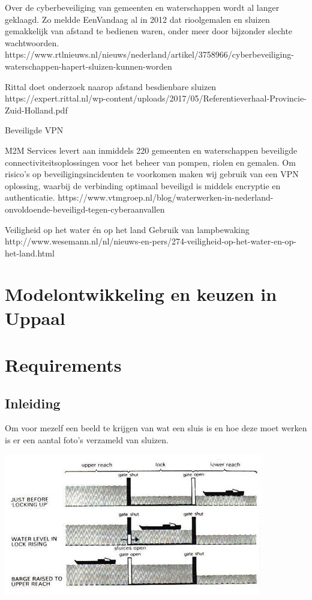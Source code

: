 {{{{{{{{{Over de cyberbeveiliging van gemeenten en waterschappen wordt al langer geklaagd. Zo meldde EenVandaag al in 2012 dat rioolgemalen en sluizen gemakkelijk van afstand te bedienen waren, onder meer door bijzonder slechte wachtwoorden.
https://www.rtlnieuws.nl/nieuws/nederland/artikel/3758966/cyberbeveiliging-waterschappen-hapert-sluizen-kunnen-worden

Rittal doet onderzoek naarop afstand besdienbare sluizen
https://expert.rittal.nl/wp-content/uploads/2017/05/Referentieverhaal-Provincie-Zuid-Holland.pdf



Beveiligde VPN

M2M Services levert aan inmiddels 220 gemeenten en waterschappen beveiligde connectiviteitsoplossingen voor het beheer van pompen, riolen en gemalen. Om risico’s op beveiligingsincidenten te voorkomen maken wij gebruik van een VPN oplossing, waarbij de verbinding optimaal beveiligd is middels encryptie en authenticatie.
https://www.vtmgroep.nl/blog/waterwerken-in-nederland-onvoldoende-beveiligd-tegen-cyberaanvallen

Veiligheid op het water én op het land
Gebruik van lampbewaking 
http://www.wesemann.nl/nl/nieuws-en-pers/274-veiligheid-op-het-water-en-op-het-land.html





\newpage
\section{Modelontwikkeling en keuzen in Uppaal}
 
\label{appendix}
\thispagestyle{myheadings}

	\section{Requirements}
\subsection{Inleiding}
Om voor mezelf een beeld te krijgen van wat een sluis is en hoe deze moet werken is er een aantal foto's verzameld van sluizen.	
	
	\includegraphics[scale=0.65]{sluismodel.jpg}
	
}}}}}}}}}
